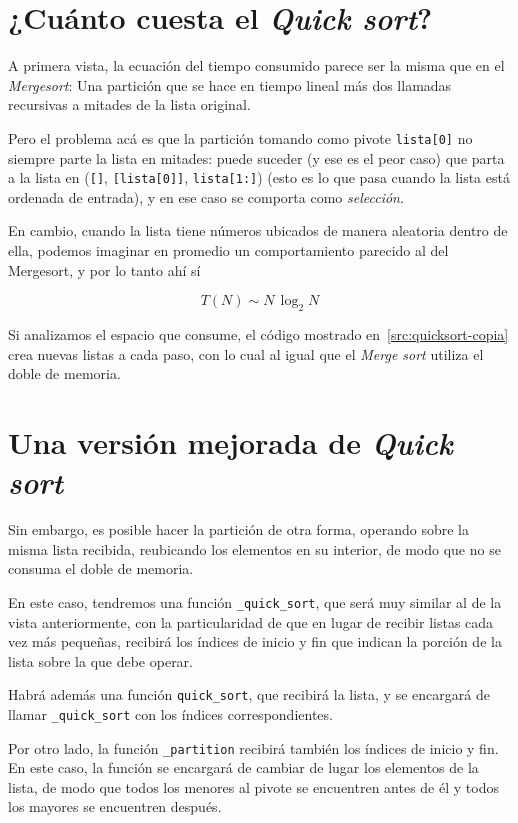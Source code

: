 \section{¿Cuánto cuesta el \emph{Quick sort}?}

A primera vista, la ecuación del tiempo consumido parece ser la misma que
en el \emph{Mergesort}: Una partición que se hace en tiempo lineal más dos
llamadas recursivas a mitades de la lista original.

Pero el problema acá es que la partición tomando como pivote
\lstinline!lista[0]! no siempre parte la lista en mitades: puede suceder (y
ese es el peor caso) que parta a la lista en (\lstinline![]!,
\lstinline![lista[0]]!, \lstinline!lista[1:]!) (esto es lo que pasa cuando
la lista está ordenada de entrada), y en ese
caso se comporta como \emph{selección}.

En cambio, cuando la lista tiene números ubicados de manera aleatoria
dentro de ella, podemos imaginar en promedio un comportamiento parecido al del
Mergesort, y por lo tanto ahí sí

$$T(N) \sim N \, \log_2 N$$

Si analizamos el espacio que consume, el código mostrado en~\ref{src:quicksort-copia}
crea nuevas listas a cada paso, con lo cual al
igual que el \emph{Merge sort} utiliza el doble de memoria.

\section{Una versión mejorada de \emph{Quick sort}}

Sin embargo, es posible hacer la partición de otra forma, operando sobre la
misma lista recibida, reubicando los elementos en su interior, de modo que
no se consuma el doble de memoria.

En este caso, tendremos una función \lstinline!_quick_sort!, que será muy
similar al de la vista anteriormente, con la particularidad de que en lugar
de recibir listas cada vez más pequeñas, recibirá los índices de inicio y
fin que indican la porción de la lista sobre la que debe operar.

Habrá además una función \lstinline!quick_sort!, que recibirá la lista,
y se encargará de llamar \lstinline!_quick_sort! con los
índices correspondientes.

Por otro lado, la función \lstinline!_partition! recibirá también los
índices de inicio y fin.  En este caso, la función se encargará de cambiar
de lugar los elementos de la lista, de modo que todos los menores al pivote
se encuentren antes de él y todos los mayores se encuentren después.

